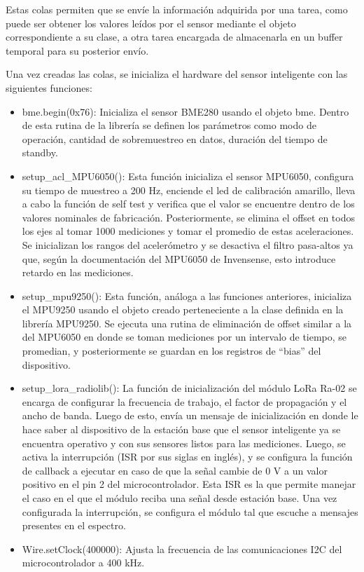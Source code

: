 Estas colas permiten que se envíe la información adquirida por una tarea, como puede ser obtener los valores leídos por el sensor mediante el objeto correspondiente a su clase, a otra tarea encargada de almacenarla en un buffer temporal para su posterior envío.

Una vez creadas las colas, se inicializa el hardware del sensor inteligente con las siguientes funciones:
\begin{itemize}
    
    \item bme.begin(0x76): Inicializa el sensor BME280 usando el objeto bme. Dentro de esta rutina de la librería se definen los parámetros como modo de operación, cantidad de sobremuestreo en datos, duración del tiempo de standby.
    \item setup\_acl\_MPU6050(): Esta función inicializa el sensor MPU6050, configura su tiempo de muestreo a 200 Hz, enciende el led de calibración amarillo, lleva a cabo la función de self test y verifica que el valor se encuentre dentro de los valores nominales de fabricación. Posteriormente, se elimina el offset en todos los ejes al tomar 1000 mediciones y tomar el promedio de estas aceleraciones. Se inicializan los rangos del acelerómetro y se desactiva el filtro pasa-altos ya que, según la documentación del MPU6050 de Invensense, esto introduce retardo en las mediciones.
    \item setup\_mpu9250(): Esta función, análoga a las funciones anteriores, inicializa el MPU9250 usando el objeto creado perteneciente a la clase definida en la librería MPU9250. Se ejecuta una rutina de eliminación de offset similar a la del MPU6050 en donde se toman mediciones por un intervalo de tiempo, se promedian, y posteriormente se guardan en los registros de ``bias'' del dispositivo.
    \item setup\_lora\_radiolib(): La función de inicialización del módulo LoRa Ra-02 se encarga de configurar la frecuencia de trabajo, el factor de propagación y el ancho de banda. Luego de esto, envía un mensaje de inicialización en donde le hace saber al dispositivo de la estación base que el sensor inteligente ya se encuentra operativo y con sus sensores listos para las mediciones. Luego, se activa la interrupción (ISR por sus siglas en inglés), y se configura la función de callback a ejecutar en caso de que la señal cambie de 0 V a un valor positivo en el pin 2 del microcontrolador. Esta ISR es la que permite manejar el caso en el que el módulo reciba una señal desde estación base. Una vez configurada la interrupción, se configura el módulo tal que escuche a mensajes presentes en el espectro.
    \item Wire.setClock(400000): Ajusta la frecuencia de las comunicaciones I2C del microcontrolador a 400 kHz.
\end{itemize}

